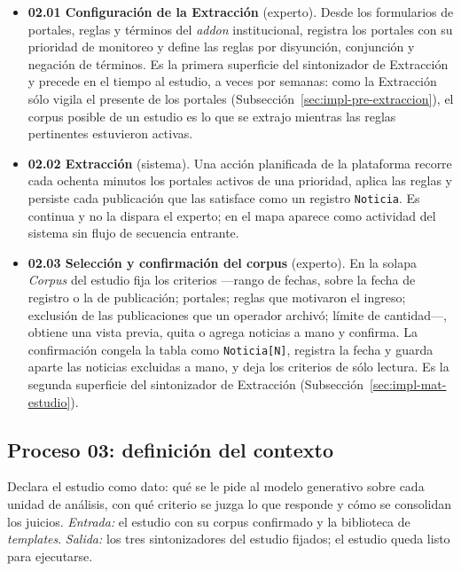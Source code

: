 \documentclass[12pt]{report}
\begin{document}
\begin{itemize}
  \item \textbf{02.01 Configuración de la Extracción} (experto). Desde los formularios de portales, reglas y términos del \textit{addon} institucional, registra los portales con su prioridad de monitoreo y define las reglas por disyunción, conjunción y negación de términos. Es la primera superficie del sintonizador de Extracción y precede en el tiempo al estudio, a veces por semanas: como la Extracción sólo vigila el presente de los portales (Subsección~\ref{sec:impl-pre-extraccion}), el corpus posible de un estudio es lo que se extrajo mientras las reglas pertinentes estuvieron activas.
  \item \textbf{02.02 Extracción} (sistema). Una acción planificada de la plataforma recorre cada ochenta minutos los portales activos de una prioridad, aplica las reglas y persiste cada publicación que las satisface como un registro \texttt{Noticia}. Es continua y no la dispara el experto; en el mapa aparece como actividad del sistema sin flujo de secuencia entrante.
  \item \textbf{02.03 Selección y confirmación del corpus} (experto). En la solapa \textit{Corpus} del estudio fija los criterios ---rango de fechas, sobre la fecha de registro o la de publicación; portales; reglas que motivaron el ingreso; exclusión de las publicaciones que un operador archivó; límite de cantidad---, obtiene una vista previa, quita o agrega noticias a mano y confirma. La confirmación congela la tabla como \texttt{Noticia[N]}, registra la fecha y guarda aparte las noticias excluidas a mano, y deja los criterios de sólo lectura. Es la segunda superficie del sintonizador de Extracción (Subsección~\ref{sec:impl-mat-estudio}).
\end{itemize}

\subsection{Proceso 03: definición del contexto}
\label{sec:proc-contexto}

Declara el estudio como dato: qué se le pide al modelo generativo sobre cada unidad de análisis, con qué criterio se juzga lo que responde y cómo se consolidan los juicios. \textit{Entrada:} el estudio con su corpus confirmado y la biblioteca de \textit{templates}. \textit{Salida:} los tres sintonizadores del estudio fijados; el estudio queda listo para ejecutarse.
\end{document}

